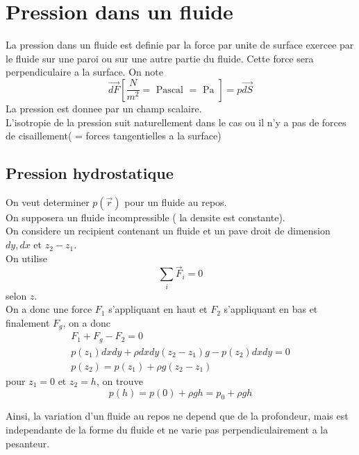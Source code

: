 \documentclass[../main.tex]{subfiles}
\begin{document}
\section{Pression dans un fluide}
La pression dans un fluide est definie par la force par unite de surface exercee par le fluide sur une paroi ou sur une autre partie du fluide. Cette force sera perpendiculaire a la surface. On note
\[ 
\vec{dF} \left[ \frac{N}{m^{2}} = \text{ Pascal } = \text{ Pa } \right]  = p \vec{dS}
\]
La pression est donnee par un champ scalaire.\\
L'isotropie de la pression suit naturellement dans le cas ou il n'y a pas de forces de cisaillement( = forces tangentielles a la surface) 

\subsection{Pression hydrostatique}
On veut determiner $p( \vec{r}) $ pour un fluide au repos.\\
On supposera un fluide incompressible ( la densite est constante).\\
On considere un recipient contenant un fluide et un pave droit de dimension $dy,dx$ et $z_2-z_1$.\\
On utilise
\[ 
	\sum_{i} \vec{F}_i = 0
\]
selon $z$.\\
On a donc une force $F_ 1$ s'appliquant en haut et $F_2$ s'appliquant en bas et finalement $F_g$, on a donc
\begin{align*}
F_1 + F_g - F_2 = 0\\
p( z_1) dx dy + \rho dx dy ( z_2-z_1) g - p( z_2) dx dy = 0\\
p( z_2) = p( z_1 ) + \rho g ( z_2 -z_1)
\end{align*}
pour $z_1=0$ et $z_2 = h$, on trouve
\[ 
	p( h) = p( 0) + \rho g h = p_{0} + \rho g h
\]

Ainsi, la variation d'un fluide au repos ne depend que de la profondeur, mais est independante de la forme du fluide et ne varie pas perpendiculairement a la pesanteur.
\end{document}
